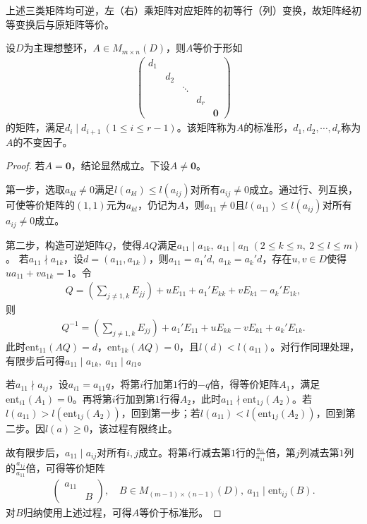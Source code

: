 \documentclass[../../main.tex]{subfiles}%
\begin{document}
\begin{remark}
上述三类矩阵均可逆，左（右）乘矩阵对应矩阵的初等行（列）变换，故矩阵经初等变换后与原矩阵等价。
\end{remark}

\begin{theorem}
设$D$为主理想整环，$A\in M_{m\times n}(D)$，则$A$等价于形如
\begin{align*}
\begin{pmatrix}
d_1&&&\\
&d_2&&\\
&&\ddots&\\
&&&d_r\\
&&&&\boldsymbol{0}
\end{pmatrix}
\end{align*}
的矩阵，满足$d_i\mid d_{i+1}\ (1\leqslant i\leqslant r-1)$。该矩阵称为$A$的标准形，$d_1,d_2,\cdots,d_r$称为$A$的不变因子。
\end{theorem}

\begin{proof}
若$A=\boldsymbol{0}$，结论显然成立。下设$A\neq\boldsymbol{0}$。

第一步，选取$a_{kl}\neq0$满足$l(a_{kl})\leqslant l(a_{ij})$对所有$a_{ij}\neq0$成立。通过行、列互换，可使等价矩阵的$(1,1)$元为$a_{kl}$，仍记为$A$，则$a_{11}\neq0$且$l(a_{11})\leqslant l(a_{ij})$对所有$a_{ij}\neq0$成立。

第二步，构造可逆矩阵$Q$，使得$AQ$满足$a_{11}\mid a_{1k},\ a_{11}\mid a_{l1}\ (2\leqslant k\leqslant n,\ 2\leqslant l\leqslant m)$。
若$a_{11}\nmid a_{1k}$，设$d=(a_{11},a_{1k})$，则$a_{11}=a_1'd,\ a_{1k}=a_k'd$，存在$u,v\in D$使得$ua_{11}+va_{1k}=1$。令
\begin{align*}
Q=\left(\sum_{j\neq1,k}E_{jj}\right)+uE_{11}+a_1'E_{kk}+vE_{k1}-a_k'E_{1k},
\end{align*}
则
\begin{align*}
Q^{-1}=\left(\sum_{j\neq1,k}E_{jj}\right)+a_1'E_{11}+uE_{kk}-vE_{k1}+a_k'E_{1k}.
\end{align*}
此时$\mathrm{ent}_{11}(AQ)=d$，$\mathrm{ent}_{1k}(AQ)=0$，且$l(d)<l(a_{11})$。对行作同理处理，有限步后可得$a_{11}\mid a_{1k},\ a_{11}\mid a_{l1}$。

若$a_{11}\nmid a_{ij}$，设$a_{i1}=a_{11}q$，将第$i$行加第$1$行的$-q$倍，得等价矩阵$A_1$，满足$\mathrm{ent}_{i1}(A_1)=0$。再将第$i$行加到第$1$行得$A_2$，此时$a_{11}\nmid\mathrm{ent}_{1j}(A_2)$。若$l(a_{11})>l(\mathrm{ent}_{1j}(A_2))$，回到第一步；若$l(a_{11})<l(\mathrm{ent}_{1j}(A_2))$，回到第二步。因$l(a)\geqslant0$，该过程有限终止。

故有限步后，$a_{11}\mid a_{ij}$对所有$i,j$成立。将第$i$行减去第$1$行的$\frac{a_{i1}}{a_{11}}$倍，第$j$列减去第$1$列的$\frac{a_{1j}}{a_{11}}$倍，可得等价矩阵
\begin{align*}
\begin{pmatrix}
a_{11}&\\
&B
\end{pmatrix},\quad B\in M_{(m-1)\times(n-1)}(D),\ a_{11}\mid\mathrm{ent}_{ij}(B).
\end{align*}
对$B$归纳使用上述过程，可得$A$等价于标准形。
\end{proof}
\end{document}

